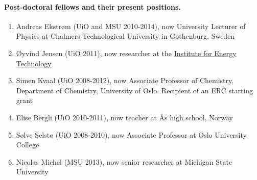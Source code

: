 \documentclass[a4wide,10pt]{article}
\begin{document}
\paragraph{Post-doctoral fellows and their present positions.}
\begin{enumerate}
\item Andreas Ekstrøm (UiO and MSU 2010-2014), now University Lecturer  of Physics  at Chalmers Technological University in Gothenburg, Sweden

\item Øyvind Jensen (UiO 2011), now researcher at the \href{{https://www.ife.no/en}}{Institute for Energy Technology}

\item Simen Kvaal (UiO 2008-2012), now Associate Professor of Chemistry, Department of Chemistry, University of Oslo. Recipient of an ERC starting grant

\item Elise Bergli (UiO 2010-2011), now teacher at Ås high school, Norway

\item Sølve Selstø (UiO 2008-2010), now Associate Professor at Oslo University College 

\item Nicolas Michel (MSU 2013), now senior researcher at Michigan State University
\end{enumerate}

\end{document}
